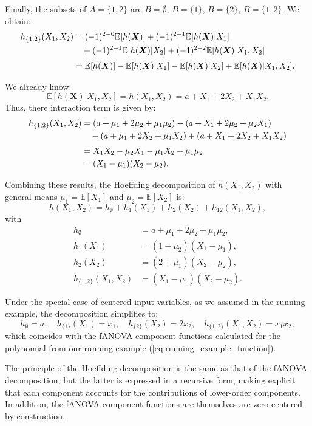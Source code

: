 Finally, the subsets of $A=\{1,2\}$ are 
$B=\emptyset$, $B=\{1\}$, $B=\{2\}$, $B=\{1,2\}$. 
We obtain:
\begin{align*}
h_{\{1,2\}}(X_1,X_2)
&= (-1)^{2-0}\mathbb{E}[h(\boldsymbol{X})]
   + (-1)^{2-1}\mathbb{E}[h(\boldsymbol{X})|X_1] \notag\\
&\quad + (-1)^{2-1}\mathbb{E}[h(\boldsymbol{X})|X_2]
   + (-1)^{2-2}\mathbb{E}[h(\boldsymbol{X})|X_1,X_2] \notag\\[0.3em]
&= \mathbb{E}[h(\boldsymbol{X})]
   - \mathbb{E}[h(\boldsymbol{X})|X_1]
   - \mathbb{E}[h(\boldsymbol{X})|X_2]
   + \mathbb{E}[h(\boldsymbol{X})|X_1,X_2].
\end{align*}

We already know:
\[
\mathbb{E}[h(\boldsymbol{X})|X_1,X_2] = h(X_1,X_2) = a + X_1 + 2X_2 + X_1 X_2.
\]
Thus, there interaction term is given by:
\begin{align}
h_{\{1,2\}}(X_1,X_2)
&= (a+\mu_1+2\mu_2+\mu_1\mu_2)
   - (a+X_1+2\mu_2+\mu_2 X_1) \notag\\
&\quad - (a+\mu_1+2X_2+\mu_1 X_2)
   + (a+X_1+2X_2+X_1 X_2) \notag\\[0.3em]
&= X_1 X_2 - \mu_2 X_1 - \mu_1 X_2 + \mu_1 \mu_2 \notag\\
&= (X_1 - \mu_1)(X_2 - \mu_2).
\end{align}


Combining these results, the Hoeffding decomposition of $h(X_1,X_2)$ with general means 
$\mu_1=\mathbb{E}[X_1]$ and $\mu_2=\mathbb{E}[X_2]$ is:
\[
h(X_1,X_2)
=
h_{\emptyset} + h_1(X_1) + h_2(X_2) + h_{12}(X_1,X_2),
\]
with
\[
\begin{aligned}
h_{\emptyset} &= a + \mu_1 + 2\mu_2 + \mu_1\mu_2, \\[0.3em]
h_1(X_1) &= (1+\mu_2)(X_1 - \mu_1), \\[0.3em]
h_2(X_2) &= (2+\mu_1)(X_2 - \mu_2), \\[0.3em]
h_{\{1,2\}}(X_1,X_2) &= (X_1 - \mu_1)(X_2 - \mu_2).
\end{aligned}
\]

Under the special case of centered input variables, as we assumed in the running example, the decomposition simplifies to:
\[
h_{\emptyset}=a,\quad
h_{\{1\}}(X_1)=x_1,\quad
h_{\{2\}}(X_2)=2x_2,\quad
h_{\{1,2\}}(X_1,X_2)=x_1 x_2,
\]
which coincides with the fANOVA component functions calculated for the polynomial from our running example (\autoref{eq:running_example_function}).\par
The principle of the Hoeffding decomposition is the same as that of the fANOVA decomposition, but the latter is expressed in a recursive form, making explicit that each component accounts for the contributions of lower-order components.
In addition, the fANOVA component functions are themselves are zero-centered by construction.


